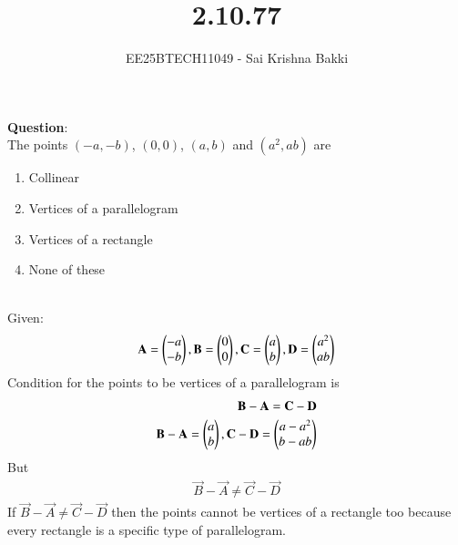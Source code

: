 \documentclass[journal]{IEEEtran}
\begin{document}

\vspace{3cm}

\title{2.10.77}
\author{EE25BTECH11049 - Sai Krishna Bakki}
 \maketitle
{\let\newpage\relax\maketitle}

\renewcommand{\thefigure}{\theenumi}
\renewcommand{\thetable}{\theenumi}
\setlength{\intextsep}{10pt} %


\renewcommand{\thetable}{\theenumi}

\textbf{Question}:\\
The points $(-a, -b)$, $(0, 0)$, $(a, b)$ and $(a^2, ab)$ are
\begin{enumerate}
\item Collinear
\item Vertices of a parallelogram
\item Vertices of a rectangle
\item None of these
\end{enumerate}
\solution \\
Given:
\begin{align}
\mathbf{A}=\begin{pmatrix}-a\\-b\end{pmatrix},\mathbf{B}=\begin{pmatrix}0\\0\end{pmatrix},\mathbf{C}=\begin{pmatrix}a\\b\end{pmatrix},\mathbf{D}=\begin{pmatrix}a^2\\ab\end{pmatrix}
\end{align}
Condition for the points to be vertices of a parallelogram is \\
\begin{align}
    \mathbf{B}-\mathbf{A}=\mathbf{C}-\mathbf{D}\\
    \mathbf{B}-\mathbf{A}=\begin{pmatrix}a\\b\end{pmatrix},\mathbf{C}-\mathbf{D}=\begin{pmatrix}a-a^2\\b-ab\end{pmatrix}
\end{align}
But
\begin{align}
\vec{B}-\vec{A} \neq \vec{C}-\vec{D}
\end{align} 
If
$\vec{B}-\vec{A} \neq \vec{C}-\vec{D}$ then the points cannot be vertices of a rectangle too because every rectangle is a specific type of parallelogram.
\end{document}
